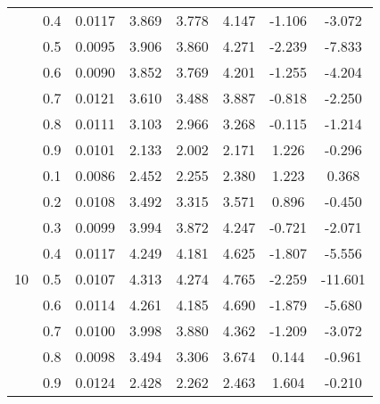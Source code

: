 \documentclass[11pt,a4paper]{report}
\begin{document}
\begin{longtable}{ | c | c || c | c | c | c | c | c | }
 & 0.4 & 0.0117 & 3.869 & 3.778 & 4.147 & -1.106 & -3.072 \\
 & 0.5 & 0.0095 & 3.906 & 3.860 & 4.271 & -2.239 & -7.833 \\
 & 0.6 & 0.0090 & 3.852 & 3.769 & 4.201 & -1.255 & -4.204 \\
 & 0.7 & 0.0121 & 3.610 & 3.488 & 3.887 & -0.818 & -2.250 \\
 & 0.8 & 0.0111 & 3.103 & 2.966 & 3.268 & -0.115 & -1.214 \\
 & 0.9 & 0.0101 & 2.133 & 2.002 & 2.171 & 1.226 & -0.296 \\
 \hline
\multirow{9}{*}{10} & 0.1 & 0.0086 & 2.452 & 2.255 & 2.380 & 1.223 & 0.368 \\
 & 0.2 & 0.0108 & 3.492 & 3.315 & 3.571 & 0.896 & -0.450 \\
 & 0.3 & 0.0099 & 3.994 & 3.872 & 4.247 & -0.721 & -2.071 \\
 & 0.4 & 0.0117 & 4.249 & 4.181 & 4.625 & -1.807 & -5.556 \\
 & 0.5 & 0.0107 & 4.313 & 4.274 & 4.765 & -2.259 & -11.601 \\
 & 0.6 & 0.0114 & 4.261 & 4.185 & 4.690 & -1.879 & -5.680 \\
 & 0.7 & 0.0100 & 3.998 & 3.880 & 4.362 & -1.209 & -3.072 \\
 & 0.8 & 0.0098 & 3.494 & 3.306 & 3.674 & 0.144 & -0.961 \\
 & 0.9 & 0.0124 & 2.428 & 2.262 & 2.463 & 1.604 & -0.210 \\
 \hline
\hline
\end{longtable}
\end{document}
